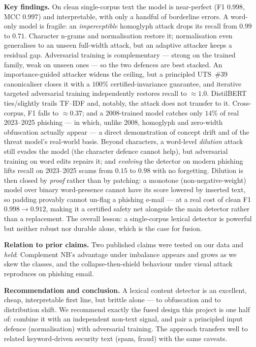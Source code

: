 \documentclass[11pt]{article}
\begin{document}
\textbf{Key findings.} On clean single-corpus text the model is near-perfect (F1
$0.998$, MCC $0.997$) and interpretable, with only a handful of borderline errors. A
word-only model is fragile: an \emph{imperceptible} homoglyph attack drops its recall
from $0.99$ to $0.71$. Character n-grams and normalisation restore it; normalisation
even generalises to an unseen full-width attack, but an adaptive attacker keeps a
residual gap. Adversarial training is complementary --- strong on the trained family,
weak on unseen ones --- so the two defences are best stacked. An importance-guided
attacker widens the ceiling, but a principled UTS~\#39 canonicaliser closes it with a
$100\%$ certified-invariance guarantee, and iterative targeted adversarial training
independently restores recall to $\approx1.0$. DistilBERT ties/slightly
trails TF--IDF and, notably, the attack does not transfer to it. Cross-corpus, F1 falls
to $\approx0.37$; and a 2008-trained model catches only $14\%$ of real 2023--2025 phishing
--- in which, unlike 2008, homoglyph and zero-width obfuscation actually appear --- a direct
demonstration of concept drift and of the threat model's real-world basis. Beyond characters, a
word-level \emph{dilution} attack still evades the model (the character defence cannot help), but
adversarial training on word edits repairs it; and \emph{evolving} the detector on modern
phishing lifts recall on 2023--2025 scams from $0.15$ to $0.98$ with no forgetting. Dilution is then
closed by \emph{proof} rather than by patching: a monotone (non-negative-weight) model over binary
word-presence cannot have its score lowered by inserted text, so padding provably cannot un-flag a
phishing e-mail --- at a real cost of clean F1 $0.998 \rightarrow 0.912$, making it a certified safety
net alongside the main detector rather than a replacement. The overall
lesson: a single-corpus lexical detector is powerful but neither robust nor durable alone, which
is the case for fusion.

\textbf{Relation to prior claims.} Two published claims were tested on our data and
\emph{held}: Complement NB's advantage under imbalance
\citep{rennie2003tackling} appears and grows as we skew the classes, and the
collapse-then-shield behaviour under visual attack \citep{eger2019viper} reproduces on
phishing email.

\textbf{Recommendation and conclusion.} A lexical content detector is an excellent,
cheap, interpretable first line, but brittle alone --- to obfuscation and to
distribution shift. We recommend exactly the fused design this project is one half of:
combine it with an independent non-text signal, and pair a principled input defence
(normalisation) with adversarial training. The approach transfers well to related
keyword-driven security text (spam, fraud) with the same caveats.



\end{document}
